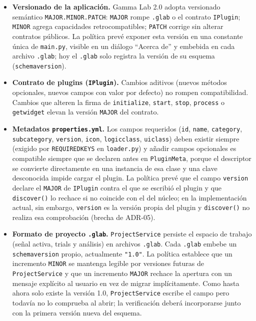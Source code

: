 \documentclass[11pt,a4paper]{article}
\DeclareRobustCommand{\_}{\textunderscore\allowbreak}
\begin{document}
\begin{itemize}
    \item \textbf{Versionado de la aplicaci\'on.} Gamma Lab 2.0 adopta versionado sem\'antico \texttt{MAJOR.\allowbreak MINOR.\allowbreak PATCH}: \texttt{MAJOR} rompe \texttt{.glab} o el contrato \texttt{IPlugin}; \texttt{MINOR} agrega capacidades retrocompatibles; \texttt{PATCH} corrige sin alterar contratos p\'ublicos. La pol\'itica prev\'e exponer esta versi\'on en una constante \'unica de \texttt{main.py}, visible en un di\'alogo ``Acerca de'' y embebida en cada archivo \texttt{.glab}; hoy el \texttt{.glab} solo registra la versi\'on de su esquema (\texttt{schema\_version}).

    \item \textbf{Contrato de plugins (\texttt{IPlugin}).} Cambios aditivos (nuevos m\'etodos opcionales, nuevos campos con valor por defecto) no rompen compatibilidad. Cambios que alteren la firma de \texttt{initialize}, \texttt{start}, \texttt{stop}, \texttt{process} o \texttt{get\_widget} elevan la versi\'on \texttt{MAJOR} del contrato.

    \item \textbf{Metadatos \texttt{properties.yml}.} Los campos requeridos (\texttt{id}, \texttt{name}, \texttt{category}, \texttt{subcategory}, \texttt{version}, \texttt{icon}, \texttt{logic\_class}, \texttt{ui\_class}) deben existir siempre (exigido por \texttt{REQUIRED\_\allowbreak KEYS} en \texttt{loader.py}) y a\~nadir campos opcionales es compatible siempre que se declaren antes en \texttt{PluginMeta}, porque el descriptor se convierte directamente en una instancia de esa clase y una clave desconocida impide cargar el plugin. La pol\'itica prev\'e que el campo \texttt{version} declare el \texttt{MAJOR} de \texttt{IPlugin} contra el que se escribi\'o el plugin y que \texttt{discover()} lo rechace si no coincide con el del n\'ucleo; en la implementaci\'on actual, sin embargo, \texttt{version} es la versi\'on propia del plugin y \texttt{discover()} no realiza esa comprobaci\'on (brecha de ADR-05).

    \item \textbf{Formato de proyecto \texttt{.glab}.} \texttt{ProjectService} persiste el espacio de trabajo (se\~nal activa, trials y an\'alisis) en archivos \texttt{.glab}. Cada \texttt{.glab} embebe un \texttt{schema\_version} propio, actualmente \texttt{"1.0"}. La pol\'itica establece que un incremento \texttt{MINOR} se mantenga legible por versiones futuras de \texttt{ProjectService} y que un incremento \texttt{MAJOR} rechace la apertura con un mensaje expl\'icito al usuario en vez de migrar impl\'icitamente. Como hasta ahora solo existe la versi\'on 1.0, \texttt{ProjectService} escribe el campo pero todav\'ia no lo comprueba al abrir; la verificaci\'on deber\'a incorporarse junto con la primera versi\'on nueva del esquema.


\end{itemize}
\end{document}
